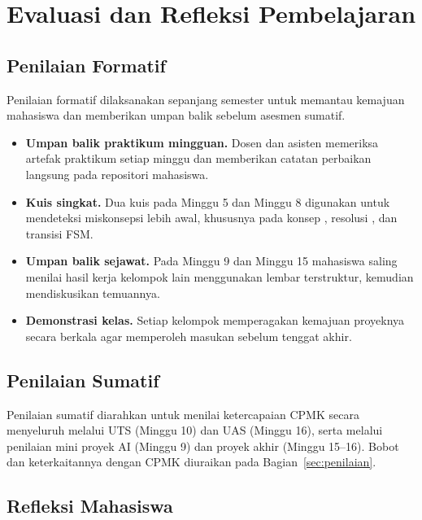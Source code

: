 
\section{Evaluasi dan Refleksi Pembelajaran}

\subsection{Penilaian Formatif}

Penilaian formatif dilaksanakan sepanjang semester untuk memantau kemajuan
mahasiswa dan memberikan umpan balik sebelum asesmen sumatif.

\begin{itemize}
  \item \textbf{Umpan balik praktikum mingguan.} Dosen dan asisten memeriksa
        artefak praktikum setiap minggu dan memberikan catatan perbaikan
        langsung pada repositori mahasiswa.
  \item \textbf{Kuis singkat.} Dua kuis pada Minggu 5 dan Minggu 8 digunakan
        untuk mendeteksi miskonsepsi lebih awal, khususnya pada konsep
        , resolusi , dan transisi FSM.
  \item \textbf{Umpan balik sejawat.} Pada Minggu 9 dan Minggu 15 mahasiswa
        saling menilai hasil kerja kelompok lain menggunakan lembar
         terstruktur, kemudian mendiskusikan temuannya.
  \item \textbf{Demonstrasi kelas.} Setiap kelompok memperagakan kemajuan
        proyeknya secara berkala agar memperoleh masukan sebelum tenggat akhir.
\end{itemize}

\subsection{Penilaian Sumatif}

Penilaian sumatif diarahkan untuk menilai ketercapaian CPMK secara menyeluruh
melalui UTS (Minggu 10) dan UAS (Minggu 16), serta melalui penilaian mini
proyek AI (Minggu 9) dan proyek akhir (Minggu 15--16). Bobot dan
keterkaitannya dengan CPMK diuraikan pada Bagian~\ref{sec:penilaian}.

\subsection{Refleksi Mahasiswa}

